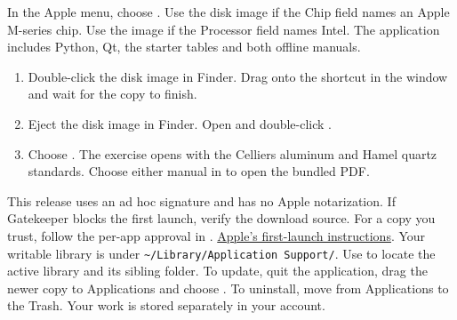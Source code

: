 In the Apple menu, choose . Use the  disk image if the Chip field names an Apple M-series chip. Use the  image if the Processor field names Intel. The application includes Python, Qt, the starter tables and both offline manuals.
\begin{enumerate}
\item Double-click the disk image in Finder. Drag  onto the  shortcut in the window and wait for the copy to finish.
\item Eject the  disk image in Finder. Open  and double-click .
\item Choose . The exercise opens with the Celliers aluminum and Hamel quartz standards. Choose either manual in  to open the bundled PDF.
\end{enumerate}
This release uses an ad hoc signature and has no Apple notarization. If Gatekeeper blocks the first launch, verify the download source. For a copy you trust, follow the per-app approval in . \href{https://support.apple.com/en-us/102445}{Apple's first-launch instructions}.
Your writable library is under \verb|~/Library/Application Support/|. Use  to locate the active library and its sibling  folder. To update, quit the application, drag the newer copy to Applications and choose . To uninstall, move  from Applications to the Trash. Your work is stored separately in your account.

